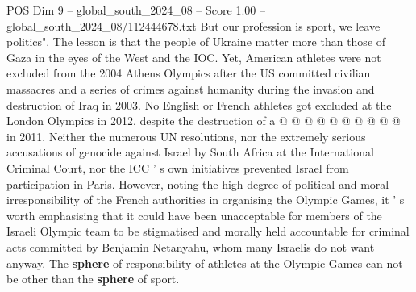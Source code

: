 \begin{textsample}{POS Dim 9 – global\_south\_2024\_08 – Score 1.00 – global\_south\_2024\_08/112444678.txt}
But our profession is sport, we leave politics".
The lesson is that the people of Ukraine matter more than those of Gaza in the eyes of the West and the IOC.
Yet, American athletes were not excluded from the 2004 Athens Olympics after the US committed civilian massacres and a series of crimes against humanity during the invasion and destruction of Iraq in 2003.
No English or French athletes got excluded at the London Olympics in 2012, despite the destruction of a @ @ @ @ @ @ @ @ @ @ in 2011.
Neither the numerous UN resolutions, nor the extremely serious accusations of genocide against Israel by South Africa at the International Criminal Court, nor the ICC ' s own initiatives prevented Israel from participation in Paris.
However, noting the high degree of political and moral irresponsibility of the French authorities in organising the Olympic Games, it ' s worth emphasising that it could have been unacceptable for members of the Israeli Olympic team to be stigmatised and morally held accountable for criminal acts committed by Benjamin Netanyahu, whom many Israelis do not want anyway.
The \textbf{sphere} of responsibility of athletes at the Olympic Games can not be other than the \textbf{sphere} of sport.

\end{textsample}
